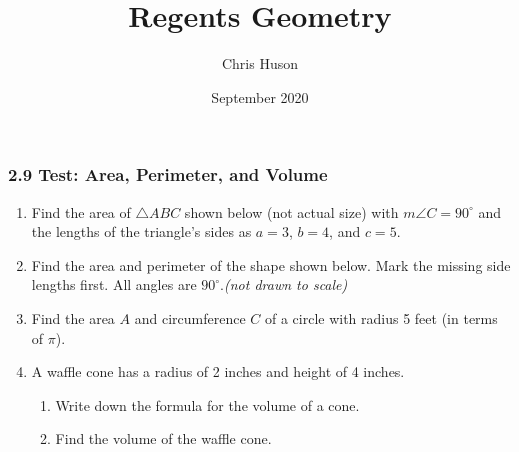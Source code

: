 \documentclass[12pt, twoside]{article}
\title{Regents Geometry}
\author{Chris Huson}
\date{September 2020}
\begin{document}
\subsubsection*{2.9 Test: Area, Perimeter, and Volume}
\begin{enumerate}
  \item Find the area of $\triangle ABC$ shown below (not actual size) with $m\angle C=90^\circ$ and the lengths of the triangle's sides as $a=3$, $b=4$, and $c=5$. 
  \begin{flushright}
  \end{flushright}
\vspace{1cm}

\item Find the area and perimeter of the shape shown below. Mark the missing side lengths first. All angles are $90^\circ$.\hfill \emph{(not drawn to scale)}
\begin{flushleft}
\end{flushleft} \vspace{1cm}

\item Find the area $A$ and circumference $C$ of a circle with radius 5 feet (in terms of $\pi$). 
  
\newpage
\item A waffle cone has a radius of 2 inches and height of 4 inches. 
\begin{enumerate}
  \item Write down the formula for the volume of a cone. \vspace{1cm}
  \item Find the volume of the waffle cone.
\end{enumerate}  \vspace{3cm}


\end{enumerate}
\end{document}

